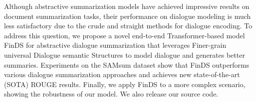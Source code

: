 Although abstractive summarization models have achieved impressive results on document summarization tasks, their performance on dialogue modeling is much less satisfactory due to the crude and straight methods for dialogue encoding. To address this question, we propose a novel end-to-end Transformer-based model FinDS for abstractive dialogue summarization that leverages Finer-grain universal Dialogue semantic Structures to model dialogue and generates better summaries. Experiments on the SAMsum dataset show that FinDS outperforms various dialogue summarization approaches and achieves new state-of-the-art (SOTA) ROUGE results. Finally, we apply FinDS to a more complex scenario, showing the robustness of our model. We also release our source code.

